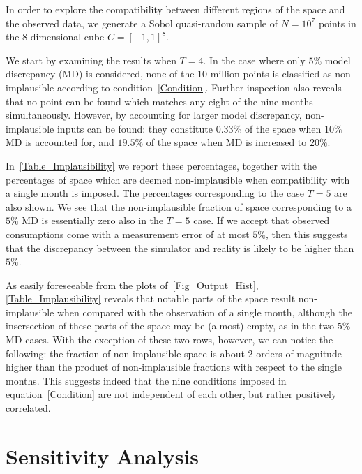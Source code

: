 \documentclass[a4paper, 12pt]{article}
\begin{document}
In order to explore the compatibility between different regions of the space and the observed data, we generate a Sobol quasi-random sample of $N = 10^7$ points in the 8-dimensional cube $C={[-1,1]}^8$.


We start by examining the results when $T=4$.
In the case where only $5\%$ model discrepancy (MD) is considered, none of the 10 million points is classified as non-implausible according to condition~\eqref{Condition}. Further inspection also reveals that no point can be found which matches any eight of the nine months simultaneously.
However, by accounting for larger model discrepancy, non-implausible inputs can be found: they constitute $0.33\%$ of the space when $10\%$ MD is accounted for, and $19.5\%$ of the space when MD is increased to $20\%$.





In~\autoref{Table_Implausibility} we report these percentages, together with the percentages of space which are deemed non-implausible when compatibility with a single month is imposed. The percentages corresponding to the case $T=5$ are also shown. We see that the non-implausible fraction of space corresponding to a $5\%$ MD is essentially zero also in the $T=5$ case. If we accept that observed consumptions come with a measurement error of at most $5\%$, then this suggests that the discrepancy between the simulator and reality is likely to be higher than $5\%$.


As easily foreseeable from the plots of~\autoref{Fig_Output_Hist}, \autoref{Table_Implausibility} reveals that notable parts of the space result non-implausible when compared with the observation of a single month, although the insersection of these parts of the space may be (almost) empty, as in the two $5\%$ MD cases. With the exception of these two rows, however, we can notice the following: the fraction of non-implausible space is about 2 orders of magnitude higher than the product of non-implausible fractions with respect to the single months. This suggests indeed that the nine conditions imposed in equation~\eqref{Condition} are not independent of each other, but rather positively correlated.

\section{Sensitivity Analysis}
\end{document}
